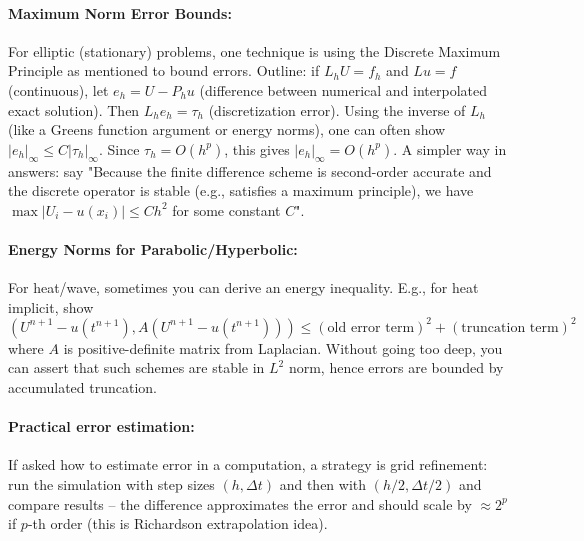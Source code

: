 \documentclass[a4paper,11pt]{report}
\begin{document}
\paragraph{Maximum Norm Error Bounds:} For elliptic (stationary) problems, one technique is using the Discrete Maximum Principle as mentioned to bound errors. Outline: if $L_h U = f_h$ and $L u = f$ (continuous), let $e_h = U - P_h u$ (difference between numerical and interpolated exact solution). Then $L_h e_h = \tau_h$ (discretization error). Using the inverse of $L_h$ (like a Greens function argument or energy norms), one can often show $|e_h|_\infty \le C |\tau_h|_\infty$. Since $\tau_h = O(h^p)$, this gives $|e_h|_\infty = O(h^p)$. A simpler way in answers: say "Because the finite difference scheme is second-order accurate and the discrete operator is stable (e.g., satisfies a maximum principle), we have $\max|U_i - u(x_i)| \le C h^2$ for some constant $C$".

\paragraph{Energy Norms for Parabolic/Hyperbolic:} For heat/wave, sometimes you can derive an energy inequality. E.g., for heat implicit, show $(U^{n+1} - u(t^{n+1}), A (U^{n+1}-u(t^{n+1}))) \le (\text{old error term})^2 + (\text{truncation term})^2$ where $A$ is positive-definite matrix from Laplacian. Without going too deep, you can assert that such schemes are stable in $L^2$ norm, hence errors are bounded by accumulated truncation.

\paragraph{Practical error estimation:} If asked how to estimate error in a computation, a strategy is grid refinement: run the simulation with step sizes $(h, \Delta t)$ and then with $(h/2, \Delta t/2)$ and compare results -- the difference approximates the error and should scale by $\approx 2^p$ if $p$-th order (this is Richardson extrapolation idea).
\end{document}
